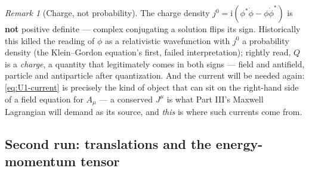 \documentclass[11pt]{article}
\theoremstyle{plain}
\theoremstyle{definition}
\theoremstyle{remark}
\newtheorem{remark}[theorem]{Remark}
\newcommand{\ii}{\mathrm{i}}
\begin{document}
\begin{remark}[Charge, not probability]
\label{rem:charge-not-probability}
The charge density $j^0 = \ii(\phi^*\dot\phi - \phi\dot\phi^*)$ is
\textbf{not} positive definite --- complex conjugating a solution
flips its sign. Historically this killed the reading of $\phi$ as a
relativistic wavefunction with $j^0$ a probability density (the
Klein--Gordon equation's first, failed interpretation); rightly read, $Q$ is
a \emph{charge}, a quantity that legitimately comes in both signs ---
field and antifield, particle and antiparticle after quantization.
And the current will be needed again: \eqref{eq:U1-current} is
precisely the kind of object that can sit on the right-hand side of a
field equation for $A_\mu$ --- a conserved $J^\mu$ is what Part III's
Maxwell Lagrangian will demand as its source, and \emph{this} is
where such currents come from.
\end{remark}

\subsection{Second run: translations and the energy-momentum tensor}
\label{sec:T-mu-nu}
\end{document}
